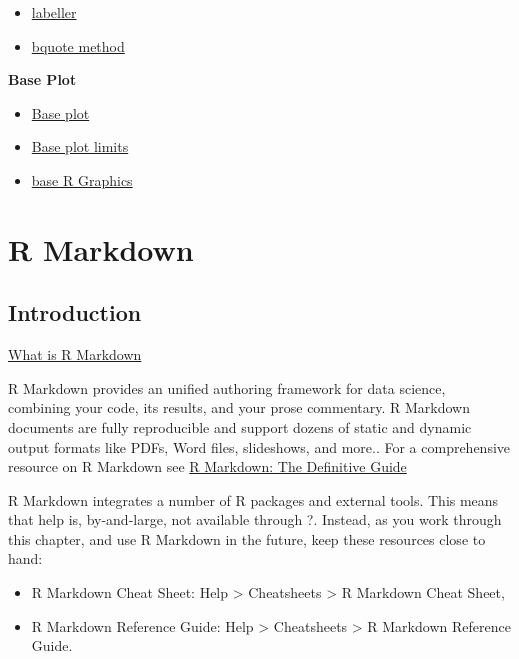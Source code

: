 \documentclass[]{book}
\providecommand{\tightlist}{%
  \setlength{\itemsep}{0pt}\setlength{\parskip}{0pt}}
\theoremstyle{definition}
\theoremstyle{definition}
\theoremstyle{definition}
\theoremstyle{remark}
\begin{document}
\begin{itemize}
\tightlist
\item
  \href{http://ggplot2.tidyverse.org/reference/label_bquote.html}{labeller}
\item
  \href{https://trinkerrstuff.wordpress.com/2018/03/15/2246/}{bquote
  method}
\end{itemize}

\textbf{Base Plot}

\begin{itemize}
\tightlist
\item
  \href{https://www.stat.auckland.ac.nz/~ihaka/120/Notes/ch03.pdf}{Base
  plot}
\item
  \href{https://www.stat.auckland.ac.nz/~ihaka/787/lectures-r-graphics.pdf}{Base
  plot limits}
\item
  \href{https://blog.jumpingrivers.com/posts/2018/2018-01-24-base-r-graphics/}{base
  R Graphics}
\end{itemize}

\hypertarget{r-markdown}{%
\chapter{R Markdown}\label{r-markdown}}

\hypertarget{introduction}{%
\section{Introduction}\label{introduction}}

\href{https://player.vimeo.com/video/178485416}{What is R Markdown}

R Markdown provides an unified authoring framework for data science,
combining your code, its results, and your prose commentary. R Markdown
documents are fully reproducible and support dozens of static and
dynamic output formats like PDFs, Word files, slideshows, and more.. For
a comprehensive resource on R Markdown see
\href{https://bookdown.org/yihui/rmarkdown/}{R Markdown: The Definitive
Guide}

R Markdown integrates a number of R packages and external tools. This
means that help is, by-and-large, not available through ?. Instead, as
you work through this chapter, and use R Markdown in the future, keep
these resources close to hand:

\begin{itemize}
\tightlist
\item
  R Markdown Cheat Sheet: Help \textgreater{} Cheatsheets \textgreater{}
  R Markdown Cheat Sheet,
\item
  R Markdown Reference Guide: Help \textgreater{} Cheatsheets
  \textgreater{} R Markdown Reference Guide.
\end{itemize}
\end{document}
